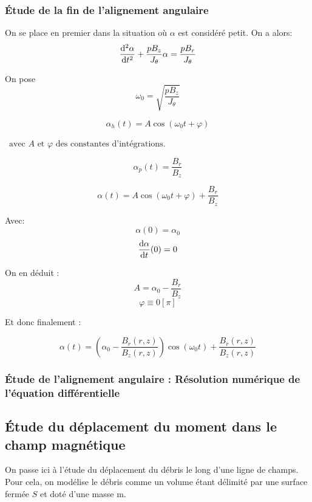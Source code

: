 \documentclass{report}
\begin{document}
\subsubsection{Étude de la fin de l'alignement angulaire}
On se place en premier dans la situation où $\alpha$ est considéré petit. On a alors:
$$\frac{\mathrm{d^2}\alpha}{\mathrm{d}t^2} + \frac{pB_z}{J_\theta}\alpha = \frac{pB_r}{J_\theta} $$

On pose $$\omega_0 = \sqrt{\frac{pB_z}{J_\theta}}$$


$$\alpha_h(t) = A \cos(\omega_0 t + \varphi)$$

$\, \text{ avec } A \text{ et } \varphi \text{ des constantes d'intégrations}$.

\newpage
{}

$$\alpha_p(t) = \frac{B_r}{B_z}$$



$$\alpha(t) = A \cos(\omega_0 t + \varphi) + \frac{B_r}{B_z}$$


Avec:
$$\alpha(0) = \alpha_0$$
$$\frac{\mathrm{d}\alpha}{\mathrm{d}t} (0) = 0$$

On en déduit : 
$$A = \alpha_0  - \frac{B_r}{B_z}$$
$$\varphi \equiv 0 \left[\pi\right] $$ 

Et donc finalement :

\begin{prettybox}[blue]
    $$\alpha(t) = \left(\alpha_0  - \frac{B_r(r,z)}{B_z(r,z)}\right) \cos(\omega_0 t) + \frac{B_r(r,z)}{B_z(r,z)}$$
\end{prettybox}

\subsubsection{Étude de l'alignement angulaire : Résolution numérique de l'équation différentielle}

\subsection{Étude du déplacement du moment dans le champ magnétique}

On passe ici à l'étude du déplacement du débris le long d'une ligne de champs. Pour cela, on modélise le débris comme un volume étant délimité par une surface fermée $S$ et doté d'une masse m.
\end{document}
